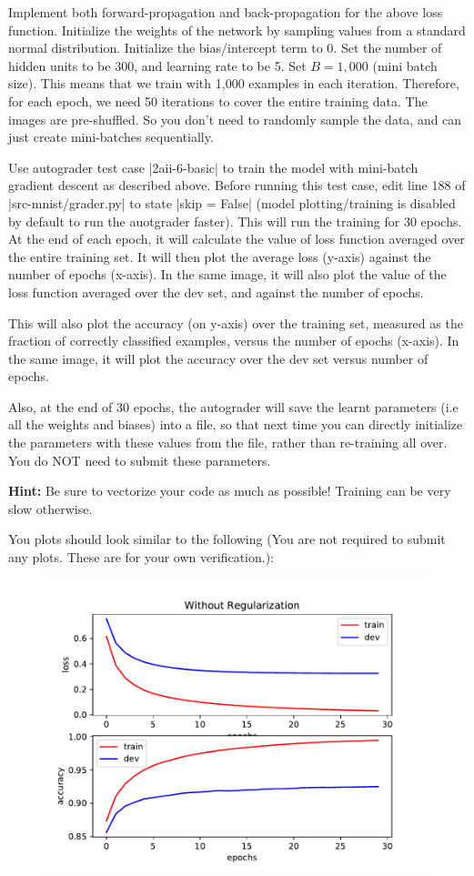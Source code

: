 \item {} 

Implement both forward-propagation and back-propagation for the above loss function.
Initialize the weights of the network by sampling values from a standard normal
distribution. Initialize the bias/intercept term to 0.
Set the number of hidden units to be 300, and learning rate to be 5. Set $B = 1,000$
(mini batch size). This means that we train with 1,000 examples in each iteration.
Therefore, for each epoch, we need 50 iterations to cover the entire training data.
The images are pre-shuffled. So you don't need to randomly sample the data, and can
just create mini-batches sequentially.

Use autograder test case |2aii-6-basic| to train the model with mini-batch gradient descent
as described above. Before running this test case, edit line 188 of |src-mnist/grader.py| to state |skip = False| (model plotting/training is disabled by default to run the auotgrader faster). This will run the training for 30 epochs. At the end of each epoch, it will calculate
the value of loss function averaged over the entire training set.  It will then plot the average loss (y-axis) against the number of epochs (x-axis). In the same image, it will also plot the value of the loss function averaged over the dev set, and against the number of epochs.

This will also plot the accuracy (on y-axis) over the training set,
measured as the fraction of correctly classified examples, versus the number of epochs
(x-axis). In the same image, it will plot the accuracy over the dev set versus number of epochs.

Also, at the end of 30 epochs, the autograder will save the learnt parameters (i.e all the weights and biases)
into a file, so that next time you can directly initialize the parameters with
these values from the file, rather than re-training all over. You do NOT need to
submit these parameters.

\textbf{Hint:} Be sure to vectorize your code as much as possible! Training can be
very slow otherwise.

\clearpage\newpage

You plots should look similar to the following (You are not required to submit any plots.  These are for your own verification.):

\begin{figure}[H]
    \centering
    \includegraphics[scale=0.75]{02-mnist/baseline.pdf}
\end{figure}
